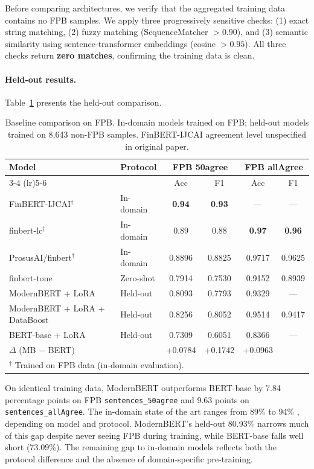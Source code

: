 \documentclass[11pt]{article}
\begin{document}
Before comparing architectures, we verify that the aggregated training data contains no FPB samples. We apply three progressively sensitive checks: (1) exact string matching, (2) fuzzy matching (SequenceMatcher $> 0.90$), and (3) semantic similarity using sentence-transformer embeddings (cosine $> 0.95$). All three checks return \textbf{zero matches}, confirming the training data is clean.

\paragraph{Held-out results.}
Table~\ref{tab:baselines} presents the held-out comparison.

\begin{table}[h]
\centering
\caption{Baseline comparison on FPB. In-domain models trained on FPB; held-out models trained on 8,643 non-FPB samples. FinBERT-IJCAI agreement level unspecified in original paper.}
\label{tab:baselines}
\begin{tabular}{llcccc}
\toprule
\textbf{Model} & \textbf{Protocol} & \multicolumn{2}{c}{\textbf{FPB 50agree}} & \multicolumn{2}{c}{\textbf{FPB allAgree}} \\
\cmidrule(lr){3-4} \cmidrule(lr){5-6}
& & Acc & F1 & Acc & F1 \\
\midrule
FinBERT-IJCAI$^\dagger$ & In-domain & \textbf{0.94} & \textbf{0.93} & --- & --- \\
finbert-lc$^\dagger$ & In-domain & 0.89 & 0.88 & \textbf{0.97} & \textbf{0.96} \\
ProsusAI/finbert$^\dagger$ & In-domain & 0.8896 & 0.8825 & 0.9717 & 0.9625 \\
finbert-tone & Zero-shot & 0.7914 & 0.7530 & 0.9152 & 0.8939 \\
\midrule
ModernBERT + LoRA & Held-out & 0.8093 & 0.7793 & 0.9329 & --- \\
ModernBERT + LoRA + DataBoost & Held-out & 0.8256 & 0.8052 & 0.9514 & 0.9417 \\
BERT-base + LoRA & Held-out & 0.7309 & 0.6051 & 0.8366 & --- \\
\midrule
$\Delta$ (MB $-$ BERT) & & +0.0784 & +0.1742 & +0.0963 & \\
\bottomrule
\multicolumn{6}{l}{\small $^\dagger$ Trained on FPB data (in-domain evaluation).}
\end{tabular}
\end{table}

On identical training data, ModernBERT outperforms BERT-base by 7.84 percentage points on FPB \texttt{sentences\_50agree} and 9.63 points on \texttt{sentences\_allAgree}. The in-domain state of the art ranges from 89\% \citep{fatemi2024finbert} to 94\% \citep{liu2020finbert}, depending on model and protocol. ModernBERT's held-out 80.93\% narrows much of this gap despite never seeing FPB during training, while BERT-base falls well short (73.09\%). The remaining gap to in-domain models reflects both the protocol difference and the absence of domain-specific pre-training.
\end{document}
